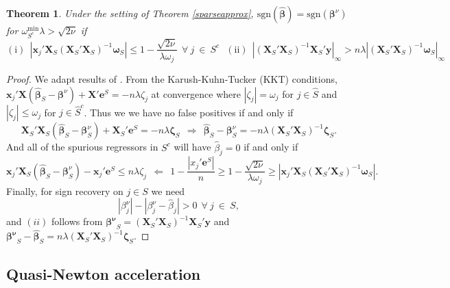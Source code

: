\documentclass[12pt]{article}
\newtheorem{theorem}{\sc Theorem}[section]
\newcommand{\bs}[1]{\boldsymbol{#1}}
\newcommand{\mr}[1]{\mathrm{#1}}
\newcommand{\bm}[1]{\mathbf{#1}}
\begin{document}
\begin{theorem}\label{signrecov}
Under the setting of Theorem \ref{sparseapprox}, $\mr{sgn}(\bs{\hat\beta}) = \mr{sgn}(\bs{\beta}^\nu)$ for $\omega_{S^c}^{\mr{min}}\lambda > \sqrt{2\nu}$ if
\begin{equation}
\mr{(i)}~~|\bs{x}_j'\bm{X}_S(\bm{X}_S'\bm{X}_S)^{-1}\bs{\omega}_S| \leq 1 - \frac{\sqrt{2\nu}}{\lambda\omega_j}~~\forall~j ~\in~S^c
~~~
\mr{(ii)}~~\left|(\bm{X}_S'\bm{X}_S)^{-1}\bm{X}_S'\bm{y}\right|_\infty > n\lambda\left|(\bm{X}_S'\bm{X}_S)^{-1}\bs{\omega}_S\right|_\infty 
\end{equation}
\end{theorem}
\begin{proof} We adapt results of \cite{wainwright_sharp_2009}.
From the Karush-Kuhn-Tucker (KKT) conditions, 
$\bm{x}_j'\bm{X}(\bs{\hat\beta}_S-\bs{\beta}^\nu) + \bm{X}'\bm{e}^S = -n\lambda\zeta_j$ at convergence where $|\zeta_j| = \omega_j$ for $j\in\hat S$ and $|\zeta_j| \leq \omega_j$ for $j\in\hat S^c$.
Thus we we have no false positives if and only if
\begin{equation}
\bm{X}_S'\bm{X}_S(\bs{\hat\beta}_S-\bs{\beta}^\nu_S) + \bm{X}_S'\bm{e}^S =-n\lambda\bs{\zeta}_S ~~\Rightarrow~~ \bs{\hat\beta}_S-\bs{\beta}^\nu_S = -n\lambda(\bm{X}_S'\bm{X}_S)^{-1}\bs{\zeta}_S.
\end{equation}
And all of the spurious regressors in $S^c$ will have $\hat \beta_j = 0$
if and only if
\begin{equation}
\bs{x}_j'\bm{X}_S(\bs{\hat\beta}_S-\bs{\beta}^\nu_S) - \bs{x}_j'\bm{e}^S 
\leq n\lambda\zeta_j ~~\Leftarrow~~
1 - \frac{|x_j'\bm{e}^S|}{n} \geq 1 - \frac{\sqrt{2\nu}}{\lambda\omega_j} \geq |\bs{x}_j'\bm{X}_S(\bm{X}_S'\bm{X}_S)^{-1}\bs{\omega}_S|.
\end{equation}
Finally, for sign recovery on $j\in S$ we need 
\begin{equation}\label{signeq}
|\beta_j^\nu| - |\beta^\nu_j - \hat\beta_j| > 0 ~~\forall~j~\in~S,
\end{equation}
and $(ii)$ follows from  $\bs{\beta^\nu}_S = (\bm{X}_S'\bm{X}_S)^{-1}\bm{X}_S'\bm{y}$ and $ \bs{\beta^\nu}_S- \bs{\hat\beta}_S = n\lambda (\bm{X}_S'\bm{X}_S)^{-1}\bs{\zeta}_S$.

\end{proof}

\subsection{Quasi-Newton acceleration}
\label{qn}
\end{document}
